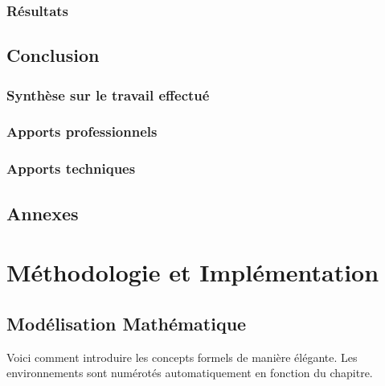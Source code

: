 \documentclass[12pt, a4paper, twoside]{report}
\begin{document}
\subsection{Résultats}


\clearpage
\section{Conclusion}


\subsection{Synthèse sur le travail effectué}


\subsection{Apports professionnels}


\subsection{Apports techniques}


\clearpage
\section{Annexes}

\clearpage
\appendix



\chapter{Méthodologie et Implémentation}


\section{Modélisation Mathématique}

Voici comment introduire les concepts formels de manière élégante. Les environnements sont numérotés automatiquement en fonction du chapitre.
\end{document}
